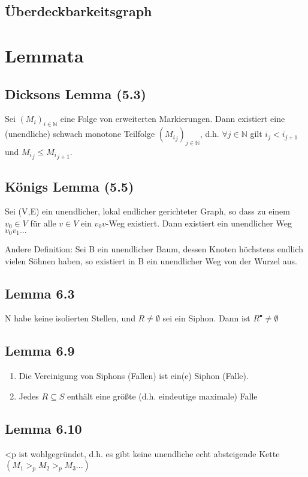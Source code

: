 \documentclass[12pt]{scrreprt}
\begin{document}
\section{Überdeckbarkeitsgraph}

\chapter{Lemmata}
\section{Dicksons Lemma (5.3)}
Sei ${(M_i)}_{i \in \mathbb{N}}$ eine Folge von erweiterten Markierungen. Dann existiert eine (unendliche) schwach monotone Teilfolge $({M_i}_j)_{j \in \mathbb{N}}$, d.h. $\forall j \in \mathbb{N}$ gilt $i_j < i_{j+1}$ und ${M_i}_j \le {M_i}_{j+1}$.

\section{Königs Lemma (5.5)}
Sei (V,E) ein unendlicher, lokal endlicher gerichteter Graph, so dass zu einem $v_0 \in V$ für alle $v \in V$ ein $v_0 v$-Weg existiert. Dann existiert ein unendlicher Weg $v_0 v_1 ...$

Andere Definition:\newline
Sei B ein unendlicher Baum, dessen Knoten höchstens endlich vielen Söhnen haben, so existiert  in B ein unendlicher Weg von der Wurzel aus.

\section{Lemma 6.3}
N habe keine isolierten Stellen, und $R \not = \emptyset$ sei ein Siphon. Dann ist $R^\bullet \not = \emptyset$

\section{Lemma 6.9}
\begin{enumerate}
	\item Die Vereinigung von Siphons (Fallen) ist ein(e) Siphon (Falle).
	\item Jedes $R \subseteq S$ enthält eine größte (d.h. eindeutige maximale) Falle
\end{enumerate}

\section{Lemma 6.10}
\ac{<p} ist wohlgegründet, d.h. es gibt keine unendliche echt absteigende Kette $(M_1 >_p M_2 >_p M_3 ...)$
\end{document}
